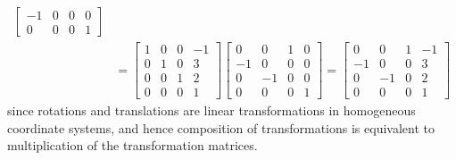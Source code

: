 \documentclass[10pt]{article}
\begin{document}
\begin{enumerate}
\begin{align*}
\begin{bmatrix}
                -1 & 0 & 0 & 0 \\
                0 & 0 & 0 & 1
            \end{bmatrix} \\
            &= \begin{bmatrix}
                1 & 0 & 0 & -1 \\
                0 & 1 & 0 & 3 \\
                0 & 0 & 1 & 2 \\
                0 & 0 & 0 & 1
            \end{bmatrix} \begin{bmatrix}
                0 & 0 & 1 & 0 \\
                -1 & 0 & 0 & 0 \\
                0 & -1 & 0 & 0 \\
                0 & 0 & 0 & 1
            \end{bmatrix} = \begin{bmatrix}
                0 & 0 & 1 & -1 \\
                -1 & 0 & 0 & 3 \\
                0 & -1 & 0 & 2 \\
                0 & 0 & 0 & 1
            \end{bmatrix}
        \end{align*}
        since rotations and translations are linear transformations in homogeneous
        coordinate systems, and hence composition of transformations is equivalent
        to multiplication of the transformation matrices.


\end{enumerate}
\end{document}
